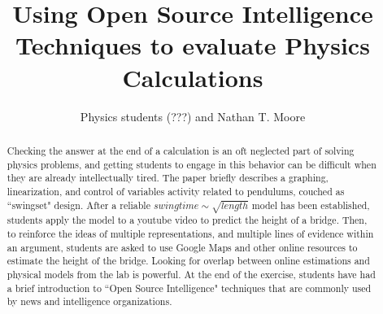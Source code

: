 \documentclass[12pt]{iopart}
\begin{document}
\title[Using Open Source Intelligence Techniques to evaluate Physics Calculations]{Using Open Source Intelligence Techniques to evaluate Physics Calculations}

\author{Physics students (???) and Nathan T. Moore}

\address{
	Physics and General Engineering, 
	Winona State University,
	Winona, MN 55987 USA
}
\vspace{10pt}
\begin{indented}
\item[\today]
\end{indented}

\begin{abstract}
Checking the answer at the end of a calculation is an oft neglected part of solving physics problems, and getting students to engage in this behavior can be difficult when they are already intellectually tired. 
The paper briefly describes a graphing, linearization, and control of variables activity related to pendulums, couched as ``swingset" design. 
After a reliable $swingtime \sim \sqrt{length}$ model has been established, students apply the model to a youtube video to predict the height of a bridge. 
Then, to reinforce the ideas of multiple representations, and multiple lines of evidence within an argument, students are asked to use Google Maps and other online resources to estimate the height of the bridge. 
Looking for overlap between online estimations and physical models from the lab is powerful. 
At the end of the exercise, students have had a brief introduction to ``Open Source Intelligence" techniques that are commonly used by news and intelligence organizations. 
\end{abstract}

%
%
%
% 
%
\end{document}
